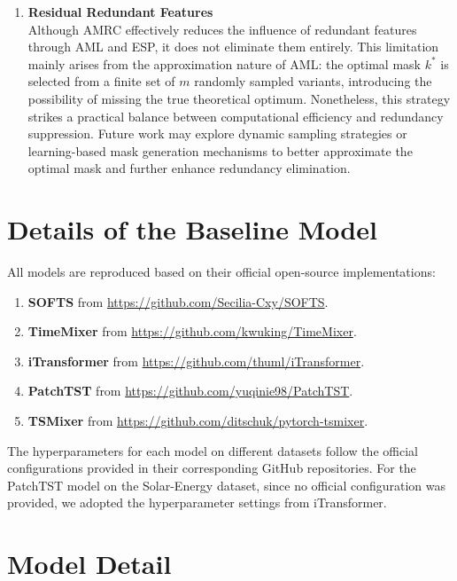 \documentclass{article}
\begin{document}
\begin{enumerate}
    \item \textbf{Residual Redundant Features} \\
    Although AMRC effectively reduces the influence of redundant features through AML and ESP, it does not eliminate them entirely. This limitation mainly arises from the approximation nature of AML: the optimal mask $k^*$ is selected from a finite set of $m$ randomly sampled variants, introducing the possibility of missing the true theoretical optimum. Nonetheless, this strategy strikes a practical balance between computational efficiency and redundancy suppression. Future work may explore dynamic sampling strategies or learning-based mask generation mechanisms to better approximate the optimal mask and further enhance redundancy elimination.
\end{enumerate}


\section{Details of the Baseline Model}
\label{sec:detailBaseline}
 All models are reproduced based on their official open-source implementations: 
 \begin{enumerate}
    \item  \textbf{SOFTS} from \url{https://github.com/Secilia-Cxy/SOFTS}.
    \item \textbf{TimeMixer} from \url{https://github.com/kwuking/TimeMixer}.
    \item \textbf{iTransformer} from \url{https://github.com/thuml/iTransformer}.
    \item \textbf{PatchTST} from \url{https://github.com/yuqinie98/PatchTST}.
    \item \textbf{TSMixer} from \url{https://github.com/ditschuk/pytorch-tsmixer}.
\end{enumerate}
The hyperparameters for each model on different datasets follow the official configurations provided in their corresponding GitHub repositories. For the PatchTST model on the Solar-Energy dataset, since no official configuration was provided, we adopted the hyperparameter settings from iTransformer.


\section{Model Detail}
\label{sec:appendix_model_detail}
\end{document}
